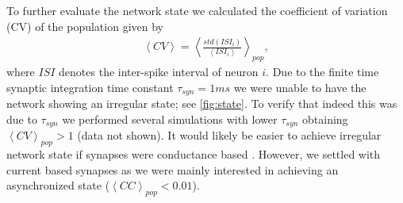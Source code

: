 \documentclass[11pt]{article}
\newcommand{\mean}[1]{\left<{#1}\right>}
\begin{document}
To further evaluate the network state we calculated the coefficient of variation (CV) of the population given by
\begin{align}
\mean{CV} = \mean{\frac{std(ISI_i)}{\mean{ISI_i}}}_{pop},
\end{align}
where $ ISI $ denotes the inter-spike interval of neuron $ i $. Due to the finite time synaptic integration time constant $ \tau_{syn} = 1 ms $ we were unable to have the network showing an irregular state; see \cref{fig:state}. To verify that indeed this was due to $ \tau_{syn} $ we performed several simulations with lower $ \tau_{syn} $ obtaining $ \mean{CV}_{pop} > 1 $ (data not shown). It would likely be easier to achieve irregular network state if synapses were conductance based \citep{Kumar2008}. However, we settled with current based synapses as we were mainly interested in achieving an asynchronized state ($ \mean{CC}_{pop} < 0.01 $).
\end{document}
